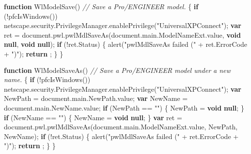 \documentclass[]{article}
\newenvironment{Shaded}{}{}
\newcommand{\KeywordTok}[1]{\textcolor[rgb]{0.00,0.44,0.13}{\textbf{{#1}}}}
\newcommand{\StringTok}[1]{\textcolor[rgb]{0.25,0.44,0.63}{{#1}}}
\newcommand{\CommentTok}[1]{\textcolor[rgb]{0.38,0.63,0.69}{\textit{{#1}}}}
\newcommand{\OtherTok}[1]{\textcolor[rgb]{0.00,0.44,0.13}{{#1}}}
\newcommand{\FunctionTok}[1]{\textcolor[rgb]{0.02,0.16,0.49}{{#1}}}
\newcommand{\NormalTok}[1]{{#1}}
\begin{document}
\begin{Shaded}
\begin{Highlighting}[]
\KeywordTok{function} \FunctionTok{WlModelSave}\NormalTok{()}
\CommentTok{//  Save a Pro/ENGINEER model.}
\NormalTok{\{ }
  \KeywordTok{if} \NormalTok{(!}\FunctionTok{pfcIsWindows}\NormalTok{())}
    \OtherTok{netscape}\NormalTok{.}\OtherTok{security}\NormalTok{.}\OtherTok{PrivilegeManager}\NormalTok{.}\FunctionTok{enablePrivilege}\NormalTok{(}\StringTok{"UniversalXPConnect"}\NormalTok{);}
  \KeywordTok{var} \NormalTok{ret = }\OtherTok{document}\NormalTok{.}\OtherTok{pwl}\NormalTok{.}\FunctionTok{pwlMdlSaveAs}\NormalTok{(}\OtherTok{document}\NormalTok{.}\OtherTok{main}\NormalTok{.}\OtherTok{ModelNameExt}\NormalTok{.}\FunctionTok{value}\NormalTok{, }\KeywordTok{void} \KeywordTok{null}\NormalTok{, }\KeywordTok{void} \KeywordTok{null}\NormalTok{);}
  \KeywordTok{if} \NormalTok{(!}\OtherTok{ret}\NormalTok{.}\FunctionTok{Status}\NormalTok{)}
    \NormalTok{\{}
      \FunctionTok{alert}\NormalTok{(}\StringTok{"pwlMdlSaveAs failed ("} \NormalTok{+ }\OtherTok{ret}\NormalTok{.}\FunctionTok{ErrorCode} \NormalTok{+ }\StringTok{")"}\NormalTok{);}
      \KeywordTok{return} \NormalTok{;}
    \NormalTok{\}}
\NormalTok{\}}

\KeywordTok{function} \FunctionTok{WlModelSaveAs}\NormalTok{()}
\CommentTok{//  Save a Pro/ENGINEER model under a new name.}
\NormalTok{\{}
  \KeywordTok{if} \NormalTok{(!}\FunctionTok{pfcIsWindows}\NormalTok{())}
    \OtherTok{netscape}\NormalTok{.}\OtherTok{security}\NormalTok{.}\OtherTok{PrivilegeManager}\NormalTok{.}\FunctionTok{enablePrivilege}\NormalTok{(}\StringTok{"UniversalXPConnect"}\NormalTok{);}
  \KeywordTok{var} \NormalTok{NewPath = }\OtherTok{document}\NormalTok{.}\OtherTok{main}\NormalTok{.}\OtherTok{NewPath}\NormalTok{.}\FunctionTok{value}\NormalTok{;}
  \KeywordTok{var} \NormalTok{NewName = }\OtherTok{document}\NormalTok{.}\OtherTok{main}\NormalTok{.}\OtherTok{NewName}\NormalTok{.}\FunctionTok{value}\NormalTok{;}
  \KeywordTok{if} \NormalTok{(NewPath == }\StringTok{""}\NormalTok{)}
    \NormalTok{\{}
      \NormalTok{NewPath = }\KeywordTok{void} \KeywordTok{null}\NormalTok{;}
    \NormalTok{\}}
  \KeywordTok{if} \NormalTok{(NewName == }\StringTok{""}\NormalTok{)}
    \NormalTok{\{}
      \NormalTok{NewName = }\KeywordTok{void} \KeywordTok{null}\NormalTok{;}
    \NormalTok{\}}
  \KeywordTok{var} \NormalTok{ret = }\OtherTok{document}\NormalTok{.}\OtherTok{pwl}\NormalTok{.}\FunctionTok{pwlMdlSaveAs}\NormalTok{(}\OtherTok{document}\NormalTok{.}\OtherTok{main}\NormalTok{.}\OtherTok{ModelNameExt}\NormalTok{.}\FunctionTok{value}\NormalTok{,}
                      \NormalTok{NewPath, NewName);}
  \KeywordTok{if} \NormalTok{(!}\OtherTok{ret}\NormalTok{.}\FunctionTok{Status}\NormalTok{)}
    \NormalTok{\{}
      \FunctionTok{alert}\NormalTok{(}\StringTok{"pwlMdlSaveAs failed ("} \NormalTok{+ }\OtherTok{ret}\NormalTok{.}\FunctionTok{ErrorCode} \NormalTok{+ }\StringTok{")"}\NormalTok{);}
      \KeywordTok{return} \NormalTok{;}
    \NormalTok{\}}
\NormalTok{\}}


\end{Highlighting}
\end{Shaded}
\end{document}
